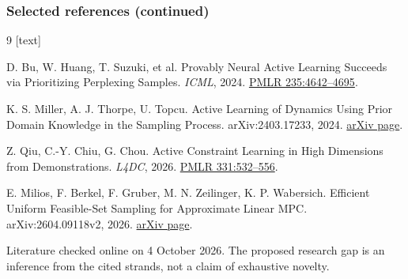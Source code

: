 \documentclass[aspectratio=169,10pt]{beamer}
\begin{document}
\begin{frame}
\frametitle{Selected references (continued)}
\scriptsize
\begin{thebibliography}{9}
[text]

D. Bu, W. Huang, T. Suzuki, et al.
\newblock Provably Neural Active Learning Succeeds via Prioritizing Perplexing Samples.
\newblock \emph{ICML}, 2024. \href{https://proceedings.mlr.press/v235/bu24a.html}{PMLR 235:4642--4695}.

K. S. Miller, A. J. Thorpe, U. Topcu.
\newblock Active Learning of Dynamics Using Prior Domain Knowledge in the Sampling Process.
\newblock arXiv:2403.17233, 2024. \href{https://arxiv.org/abs/2403.17233}{arXiv page}.

Z. Qiu, C.-Y. Chiu, G. Chou.
\newblock Active Constraint Learning in High Dimensions from Demonstrations.
\newblock \emph{L4DC}, 2026. \href{https://proceedings.mlr.press/v331/qiu26a.html}{PMLR 331:532--556}.

E. Milios, F. Berkel, F. Gruber, M. N. Zeilinger, K. P. Wabersich.
\newblock Efficient Uniform Feasible-Set Sampling for Approximate Linear MPC.
\newblock arXiv:2604.09118v2, 2026. \href{https://arxiv.org/abs/2604.09118v2}{arXiv page}.

\end{thebibliography}

\vfill
\color{Slate}\tiny Literature checked online on 4 October 2026. The proposed research gap is an inference from the cited strands, not a claim of exhaustive novelty.
\end{frame}

\appendix
\end{document}
